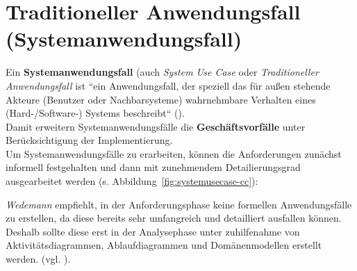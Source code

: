 
\section{Traditioneller Anwendungsfall (Systemanwendungsfall)}


\begin{tcolorbox}[title={Traditioneller Anwendungsfall (Systemanwendungsfall)}]
    Ein \textbf{Systemanwendungsfall} (auch \textit{System Use Case} oder \textit{Traditioneller Anwendungsfall}
    ist ``ein Anwendungsfall, der speziell das für außen stehende Akteure (Benutzer oder Nachbarsysteme) wahrnehmbare Verhalten eines (Hard-/Software-) Systems beschreibt`` (\cite[361]{Oes05}).\\
\noindent
Damit erweitern Systemanwendungsfälle die \textbf{Geschäftsvorfälle} unter Berücksichtigung der Implementierung.\\

\noindent
Um Systemanwendungsfälle zu erarbeiten, können die Anforderungen zunächst informell festgehalten und dann mit zunehmendem Detailierungsgrad ausgearbeitet werden (s. Abbildung~\ref{fig:systemusecase-cc}):

\noindent
\textit{Wedemann} empfiehlt, in der Anforderungsphase keine formellen Anwendungsfälle zu erstellen, da diese bereits sehr umfangreich und detailliert ausfallen können.
Deshalb sollte diese erst in der Analysephase unter zuhilfenahme von Aktivitätsdiagrammen, Ablaufdiagrammen und Domänenmodellen erstellt werden. (vgl. \cite[71]{Wed09}).


\end{tcolorbox}
